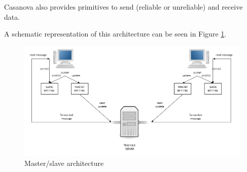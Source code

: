 Casanova also provides primitives to send (reliable or unreliable) and receive data.

A schematic representation of this architecture can be seen in Figure \ref{fig:masterslave}.

\begin{figure}
	\includegraphics[scale=0.3]{Figures/masterslave}
	\caption{Master/slave architecture}
	\label{fig:masterslave}
\end{figure}
